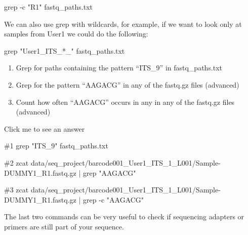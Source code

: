 \documentclass[
  letterpaper,
  DIV=11,
  numbers=noendperiod]{scrreprt}
\newenvironment{Shaded}{}{}
\newcommand{\AttributeTok}[1]{\textcolor[rgb]{0.84,0.23,0.29}{#1}}
\newcommand{\CommentTok}[1]{\textcolor[rgb]{0.42,0.45,0.49}{#1}}
\newcommand{\FunctionTok}[1]{\textcolor[rgb]{0.44,0.26,0.76}{#1}}
\newcommand{\KeywordTok}[1]{\textcolor[rgb]{0.84,0.23,0.29}{#1}}
\newcommand{\NormalTok}[1]{\textcolor[rgb]{0.14,0.16,0.18}{#1}}
\newcommand{\StringTok}[1]{\textcolor[rgb]{0.01,0.18,0.38}{#1}}
\providecommand{\tightlist}{%
  \setlength{\itemsep}{0pt}\setlength{\parskip}{0pt}}\usepackage{longtable,booktabs,array}
\begin{document}
\begin{Shaded}
\begin{Highlighting}[]
\FunctionTok{grep} \AttributeTok{{-}c} \StringTok{"R1"}\NormalTok{ fastq\_paths.txt}
\end{Highlighting}
\end{Shaded}

We can also use grep with wildcards, for example, if we want to look
only at samples from User1 we could do the following:

\begin{Shaded}
\begin{Highlighting}[]
\FunctionTok{grep} \StringTok{"User1\_ITS\_*\_"}\NormalTok{ fastq\_paths.txt}
\end{Highlighting}
\end{Shaded}

\begin{tcolorbox}[enhanced jigsaw, colframe=quarto-callout-caution-color-frame, colbacktitle=quarto-callout-caution-color!10!white, opacitybacktitle=0.6, breakable, titlerule=0mm, colback=white, toptitle=1mm, leftrule=.75mm, opacityback=0, coltitle=black, left=2mm, toprule=.15mm, bottomtitle=1mm, rightrule=.15mm, title=\textcolor{quarto-callout-caution-color}{\faFire}\hspace{0.5em}{Exercise}, bottomrule=.15mm, arc=.35mm]

\begin{enumerate}
\def\labelenumi{\arabic{enumi}.}
\tightlist
\item
  Grep for paths containing the pattern ``ITS\_9'' in fastq\_paths.txt
\item
  Grep for the pattern ``AAGACG'' in any of the fastq.gz files
  (advanced)
\item
  Count how often ``AAGACG'' occurs in any in any of the fastq.gz files
  (advanced)
\end{enumerate}

Click me to see an answer

\begin{Shaded}
\begin{Highlighting}[]
\CommentTok{\#1}
\FunctionTok{grep} \StringTok{"ITS\_9"}\NormalTok{ fastq\_paths.txt}

\CommentTok{\#2}
\FunctionTok{zcat}\NormalTok{ data/seq\_project/barcode001\_User1\_ITS\_1\_L001/Sample{-}DUMMY1\_R1.fastq.gz }\KeywordTok{|} \FunctionTok{grep} \StringTok{"AAGACG"}

\CommentTok{\#3}
\FunctionTok{zcat}\NormalTok{ data/seq\_project/barcode001\_User1\_ITS\_1\_L001/Sample{-}DUMMY1\_R1.fastq.gz }\KeywordTok{|} \FunctionTok{grep} \AttributeTok{{-}c} \StringTok{"AAGACG"}
\end{Highlighting}
\end{Shaded}

The last two commands can be very useful to check if sequencing adapters
or primers are still part of your sequence.

\end{tcolorbox}
\end{document}
